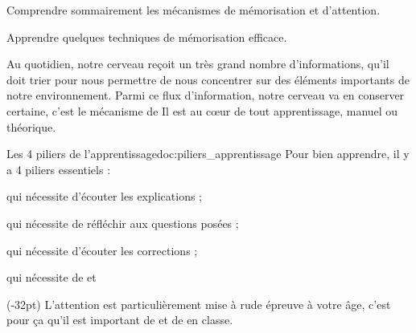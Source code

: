 \teteSndAP
\vspace*{-32pt}

\begin{objectifs}
  \item Comprendre sommairement les mécanismes de mémorisation et d'attention.
  \item Apprendre quelques techniques de mémorisation efficace.
\end{objectifs}

\begin{contexte}
  Au quotidien, notre cerveau reçoit un très grand nombre d'informations, qu'il doit trier pour nous permettre de nous concentrer sur des éléments importants de notre environnement.
  Parmi ce flux d'information, notre cerveau va en conserver certaine, c'est le mécanisme de  Il est au cœur de tout apprentissage, manuel ou théorique.

\end{contexte}

\begin{doc}{Les 4 piliers de l'apprentissage}{doc:piliers_apprentissage}
  Pour bien apprendre, il y a 4 piliers essentiels : 
  \begin{listePoints}
    \item {} qui nécessite d'écouter les explications ;
    \item {} qui nécessite de réfléchir aux questions posées ;
    \item {} qui nécessite d'écouter les corrections ;
    \item {} qui nécessite de  et 
  \end{listePoints}

  (-32pt)
  L'attention est particulièrement mise à rude épreuve à votre âge, c'est pour ça qu'il est important de  et de  en classe.
\end{doc}

